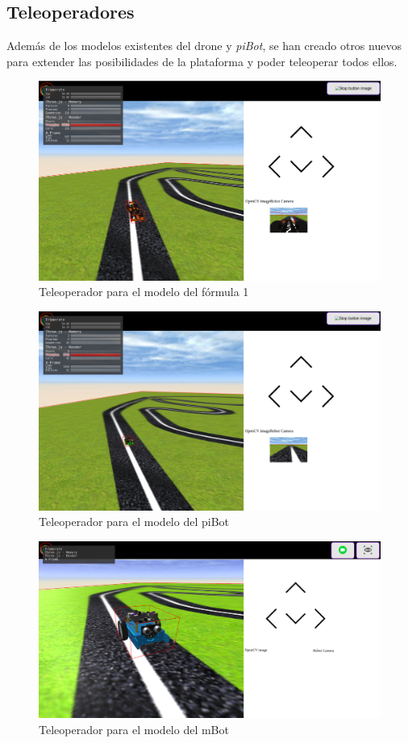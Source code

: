 \subsection{Teleoperadores}

Además de los modelos existentes del drone y \textit{piBot}, se han creado otros nuevos para extender las posibilidades de la plataforma y poder teleoperar todos ellos.
\begin{figure}[H]
    \centering            \includegraphics[scale=0.35]{img/f1_teleoperator.png}
    \caption{Teleoperador para el modelo del fórmula 1} \label{fig:f1_teleoperator}
\end{figure}
\begin{figure}[H]
    \centering            \includegraphics[scale=0.35]{img/pibot_teleoperator.png}
    \caption{Teleoperador para el modelo del piBot} \label{fig:piBot_teleoperator}
\end{figure}
  \begin{figure}[H]
    \centering
    \includegraphics[scale=0.3]{img/mBot_teleoperator.png}
    \caption{Teleoperador para el modelo del mBot} \label{fig:mBot_teleoperator}
\end{figure}
